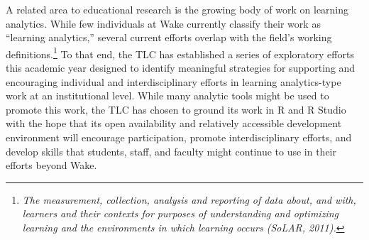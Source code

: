 \documentclass[]{tufte-handout}
\begin{document}
A related area to educational research is the growing body of work on
learning analytics. While few individuals at Wake currently classify
their work as ``learning analytics,'' several current efforts overlap
with the field's working definitions.\footnote{\emph{The measurement,
  collection, analysis and reporting of data about, and with, learners
  and their contexts for purposes of understanding and optimizing
  learning and the environments in which learning occurs (SoLAR, 2011).}}
To that end, the TLC has established a series of exploratory efforts
this academic year designed to identify meaningful strategies for
supporting and encouraging individual and interdisciplinary efforts in
learning analytics-type work at an institutional level. While many
analytic tools might be used to promote this work, the TLC has chosen to
ground its work in R and R Studio with the hope that its open
availability and relatively accessible development environment will
encourage participation, promote interdisciplinary efforts, and develop
skills that students, staff, and faculty might continue to use in their
efforts beyond Wake.
\end{document}
